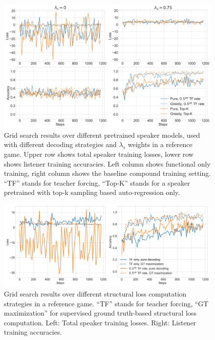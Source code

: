 \begin{figure}[h]
	\centering
	\includegraphics[width=\linewidth]{images/grid_search_pretraining_Ls_decoding.png}
	\caption{Grid search results over different pretrained speaker models, used with different decoding strategies and $\lambda_s$ weights in a reference game. Upper row shows total speaker training losses, lower row shows listener training accuracies. Left column shows functional only training, right column shows the baseline compound training setting. ``TF'' stands for teacher forcing, ``Top-K'' stands for a speaker pretrained with top-k sampling based auto-regression only.}
	\label{fig:coco_grid_pretraining_decoding}
\end{figure}

\begin{figure}[h]
	\centering
	\includegraphics[width=\linewidth]{images/grid_search_Ls_calculation.png}
	\caption{Grid search results over different structural loss computation strategies in a reference game. ``TF'' stands for teacher forcing, ``GT maximization'' for supervised ground truth-based structural loss computation. Left: Total speaker training losses. Right: Listener training accuracies.}
	\label{fig:coco_grid_Ls_calc}
\end{figure}

